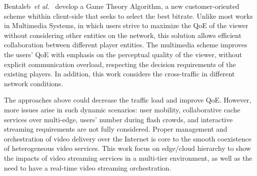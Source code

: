 Bentaleb~\textit{et al.}~\cite{bentaleb:2018:MSys} develop a Game Theory Algorithm, a new customer-oriented scheme whithin client-side that seeks to select the best bitrate. Unlike most works in Multimedia Systems, in which users strive to maximize the QoE of the viewer without considering other entities on the network, this solution allows efficient collaboration between different player entities. The multimedia scheme improves the users' QoE with emphasis on the perceptual quality of the viewer, without explicit communication overload, respecting the decision requirements of the existing players. In addition, this work considers the cross-traffic in different network conditions.

The approaches above could decrease the traffic load and improve QoE. However, more issues arise in such dynamic scenarios: user mobility, collaborative cache services over multi-edge, users' number during flash crowds, and interactive streaming requirements are not fully considered.  Proper management and orchestration of video delivery over the Internet is core to the smooth coexistence of heterogeneous video services. This work focus on edge/cloud hierarchy to show the impacts of video streaming services in a multi-tier environment, as well as the need to have a real-time video streaming orchestration.

%
%
